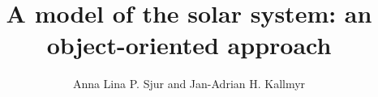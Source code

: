 \documentclass[a4paper, 11pt, twocolumn]{article}
\begin{document}
\title{A model of the solar system: an object-oriented approach}

\author{Anna Lina P. Sjur and Jan-Adrian H. Kallmyr}

\twocolumn[
  \begin{@twocolumnfalse}
    \maketitle
    
  \end{@twocolumnfalse}
]














\end{document}
